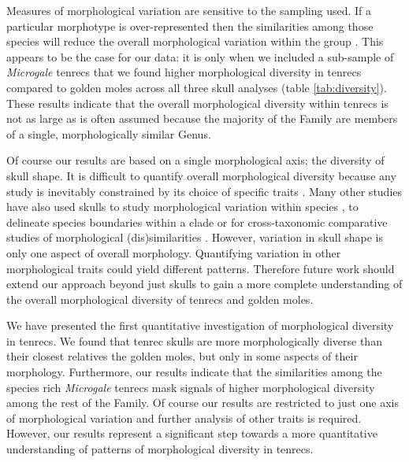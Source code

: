 \documentclass[12pt,a4paper]{article}
\begin{document}
	
	
	Measures of morphological variation are sensitive to the sampling used. If a particular morphotype is over-represented then the similarities among those species will reduce the overall morphological variation within the group \citep{Foote1991}. This appears to be the case for our data: it is only when we included a sub-sample of \textit{Microgale} tenrecs that we found higher morphological diversity in tenrecs compared to golden moles across all three skull analyses (table \ref{tab:diversity}). These results indicate that the overall morphological diversity within tenrecs is not as large as is often assumed \citep[e.g.][]{Eisenberg1969, Olson2013} because the majority of the Family are members of a single, morphologically similar Genus.


	Of course our results are based on a single morphological axis; the diversity of skull shape. It is difficult to quantify overall morphological diversity because any study is inevitably constrained by its choice of specific traits \citep{Roy1997}. Many other studies have also used skulls to study morphological variation within species \citep{Blagojevic2011, Bornholdt2008}, to delineate species boundaries within a clade \citep[e.g.][]{Panchetti2008} or for cross-taxonomic comparative studies of morphological (dis)similarities \citep[e.g.][]{Ruta2013, Goswami2011, Wroe2007}. 
	However, variation in skull shape is only one aspect of overall morphology. Quantifying variation in other morphological traits could yield different patterns. Therefore future work should extend our approach beyond just skulls to gain a more complete understanding of the overall morphological diversity of tenrecs and golden moles. 
		
	We have presented the first quantitative investigation of morphological diversity in tenrecs. We found that tenrec skulls are more morphologically diverse than their closest relatives the golden moles, but only in some aspects of their morphology. Furthermore, our results indicate that the similarities among the species rich \textit{Microgale} tenrecs mask signals of higher morphological diversity among the rest of the Family. Of course our results are restricted to just one axis of morphological variation and further analysis of other traits is required. However, our results represent a significant step towards a more quantitative understanding of patterns of morphological diversity in tenrecs. 
\end{document}
